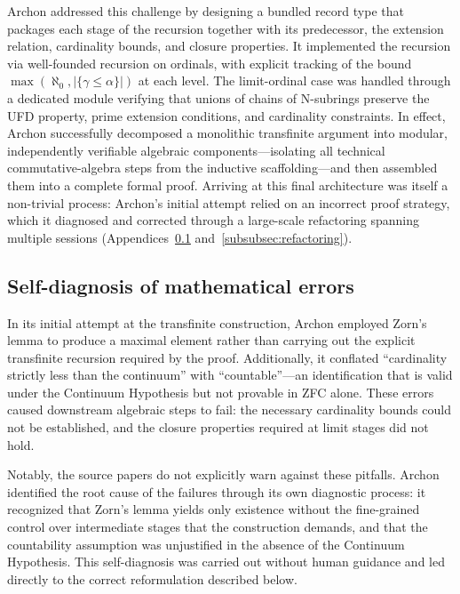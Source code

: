 \documentclass[]{pkuai4m}
\theoremstyle{plain}
\theoremstyle{definition}
\begin{document}
Archon addressed this challenge by designing a bundled record type that packages each stage of the recursion together with its predecessor, the extension relation, cardinality bounds, and closure properties. It implemented the recursion via well-founded recursion on ordinals, with explicit tracking of the bound $\max(\aleph_0, |\{\gamma \le \alpha\}|)$ at each level. The limit-ordinal case was handled through a dedicated module verifying that unions of chains of N-subrings preserve the UFD property, prime extension conditions, and cardinality constraints. In effect, Archon successfully decomposed a monolithic transfinite argument into modular, independently verifiable algebraic components---isolating all technical commutative-algebra steps from the inductive scaffolding---and then assembled them into a complete formal proof. Arriving at this final architecture was itself a non-trivial process: Archon's initial attempt relied on an incorrect proof strategy, which it diagnosed and corrected through a large-scale refactoring spanning multiple sessions (Appendices~\ref{subsubsec:self-diagnosis} and~\ref{subsubsec:refactoring}).

\subsection{Self-diagnosis of mathematical errors}\label{subsubsec:self-diagnosis}

In its initial attempt at the transfinite construction, Archon employed Zorn's lemma to produce a maximal element rather than carrying out the explicit transfinite recursion required by the proof. Additionally, it conflated ``cardinality strictly less than the continuum'' with ``countable''---an identification that is valid under the Continuum Hypothesis but not provable in ZFC alone. These errors caused downstream algebraic steps to fail: the necessary cardinality bounds could not be established, and the closure properties required at limit stages did not hold.

Notably, the source papers do not explicitly warn against these pitfalls. Archon identified the root cause of the failures through its own diagnostic process: it recognized that Zorn's lemma yields only existence without the fine-grained control over intermediate stages that the construction demands, and that the countability assumption was unjustified in the absence of the Continuum Hypothesis. This self-diagnosis was carried out without human guidance and led directly to the correct reformulation described below.
\end{document}
